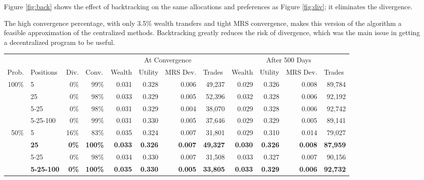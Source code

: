 \documentclass[12pt,a4paper,titlepage]{article}
\begin{document}
Figure \ref{fig:back} shows the effect of backtracking on the same allocations and preferences as Figure \ref{fig:div}; it eliminates the divergence.

The high convergence percentage, with only 3.5\% wealth transfers and tight MRS convergence, makes this version of the algorithm a feasible approximation of the centralized methods. 
Backtracking greatly reduces the risk of divergence, which was the main issue in getting a decentralized program to be useful.

\begin{sidewaystable}
  \begin{tabular}{rl|rr|rrrr|rrrr}

    \multicolumn{1}{l}{} &  & \multicolumn{1}{l}{} & \multicolumn{1}{l}{} & \multicolumn{ 4}{|c|}{At Convergence} & \multicolumn{ 4}{c}{After 500 Days} \\ 
    \multicolumn{1}{l}{Prob.} & Positions & \multicolumn{1}{l}{Div.} & \multicolumn{1}{l|}{Conv.} & \multicolumn{1}{l}{Wealth} & \multicolumn{1}{l}{Utility} & \multicolumn{1}{l}{MRS Dev.} & \multicolumn{1}{l|}{Trades} & \multicolumn{1}{l}{Wealth} & \multicolumn{1}{l}{Utility} & \multicolumn{1}{l}{MRS Dev.} & \multicolumn{1}{l}{Trades} \\ 
    \hline
    \multicolumn{ 1}{r}{100\%} & 5 & 0\% & 99\% & 0.031 & 0.328 & 0.006 & 49,237 & 0.029 & 0.326 & 0.008 & 89,784 \\ 
    \multicolumn{ 1}{r}{} & 25 & 0\% & 98\% & 0.033 & 0.329 & 0.005 & 52,396 & 0.032 & 0.328 & 0.006 & 92,192 \\ 
    \multicolumn{ 1}{r}{} & 5-25 & 0\% & 98\% & 0.031 & 0.329 & 0.004 & 38,070 & 0.029 & 0.328 & 0.006 & 92,742 \\ 
    \multicolumn{ 1}{r}{} & 5-25-100 & 0\% & 99\% & 0.031 & 0.330 & 0.005 & 37,646 & 0.029 & 0.329 & 0.005 & 89,141 \\ 
    \multicolumn{ 1}{r}{50\%} & 5 & 16\% & 83\% & 0.035 & 0.324 & 0.007 & 31,801 & 0.029 & 0.310 & 0.014 & 79,027 \\ 
    \multicolumn{ 1}{r}{} & \textbf{25} & \textbf{0\%} & \textbf{100\%} & \textbf{0.033} & \textbf{0.326} & \textbf{0.007} & \textbf{49,327} & \textbf{0.030} & \textbf{0.326} & \textbf{0.008} & \textbf{87,959} \\ 
    \multicolumn{ 1}{r}{} & 5-25 & 0\% & 98\% & 0.034 & 0.330 & 0.007 & 31,508 & 0.033 & 0.327 & 0.007 & 90,156 \\ 
    \multicolumn{ 1}{r}{} & \textbf{5-25-100} & \textbf{0\%} & \textbf{100\%} & \textbf{0.035} & \textbf{0.330} & \textbf{0.005} & \textbf{33,805} & \textbf{0.033} & \textbf{0.329} & \textbf{0.006} & \textbf{92,732} \\ 

\end{tabular}
\end{sidewaystable}
\end{document}
